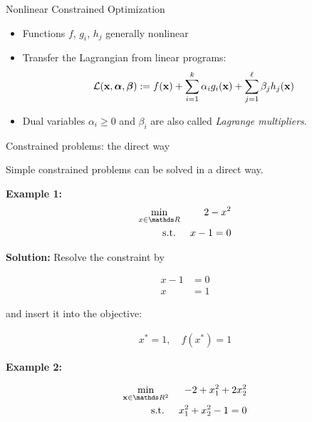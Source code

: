 \documentclass[11pt,compress,t,notes=noshow, xcolor=table]{beamer}
\begin{document}
\begin{vbframe}{Nonlinear Constrained Optimization}
\begin{itemize}
    \item Functions $f$, $g_i$, $h_j$ generally nonlinear
    \item Transfer the Lagrangian from linear programs:
        \begin{equation*}
            \mathcal{L}(\mathbf{x}, \bm{\alpha}, \bm{\beta}) := f(\mathbf{x}) + \sum_{i=1}^k \alpha_i g_i(\mathbf{x}) + \sum_{j=1}^\ell \beta_j h_j(\mathbf{x})
        \end{equation*}
    \item Dual variables $\alpha_i \ge 0$ and $\beta_i$ are also called \textit{Lagrange multipliers}.
\end{itemize}

\end{vbframe}

\begin{vbframe}{Constrained problems: the direct way}

Simple constrained problems can be solved in a direct way.

\medskip

\textbf{Example 1:}
\begin{eqnarray*}
    \min_{x\in \R} && 2 - x^2 \\
    \text{s.t. } && x - 1 = 0
\end{eqnarray*}

\textbf{Solution:} Resolve the constraint by

\vspace{-\baselineskip}

\begin{align*}
    x - 1 &= 0 \\
    x &= 1
\end{align*}

and insert it into the objective: 

\vspace*{-\baselineskip}

\begin{align*}
    x^\ast = 1, \quad f(x^\ast) = 1
\end{align*}

\framebreak

\textbf{Example 2:}

\vspace*{-\baselineskip}

\begin{eqnarray*}
    \min_{\xv \in \R^2} && - 2 + x_1^2 + 2 x_2^2\\
    \text{s.t. } && x_1^2 + x_2^2 - 1 = 0
\end{eqnarray*}


\end{vbframe}
\end{document}
